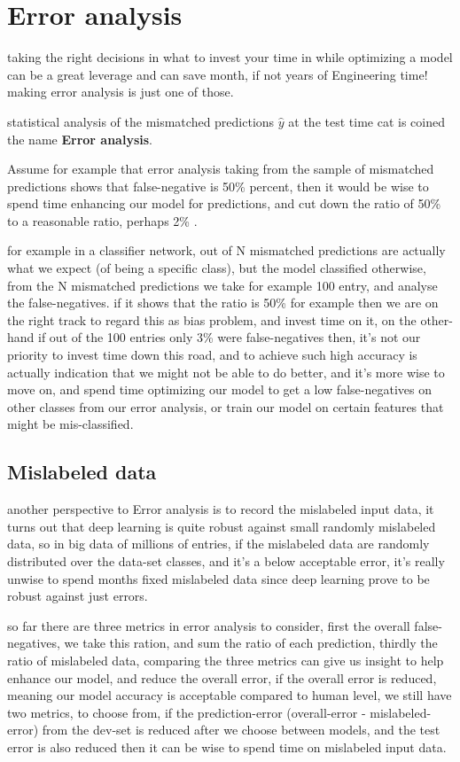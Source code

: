 \documentclass[4apaper,12pt]{book}
\begin{document}
  \section{Error analysis}
  \begin{description}
\item taking the right decisions in what to invest your time in while optimizing a model can be a great leverage and can save month, if not years of Engineering time! making error analysis is just one of those.

\item statistical analysis of the mismatched predictions $\hat{y}$ at the test time cat is coined the name \textbf{Error analysis}.
\item Assume for example that error analysis taking from the sample of mismatched predictions shows that false-negative is 50\% percent, then it would be wise to spend time enhancing our model for predictions, and cut down the ratio of 50\% to a reasonable ratio, perhaps 2\% .
\item for example in a classifier network, out of N mismatched predictions are actually what we expect (of being a specific class), but the model classified otherwise, from the N mismatched predictions we take for example 100 entry, and analyse the false-negatives. if it shows that the ratio is 50\% for example then we are on the right track to regard this as bias problem, and invest time on it, on the other-hand if out of the 100 entries only 3\% were false-negatives then, it's not our priority to invest time down this road, and to achieve such high accuracy is actually indication that we might not be able to do better, and it's more wise to move on, and spend time optimizing our model to get a low false-negatives on other classes from our error analysis, or train our model on certain features that might be mis-classified.
  \subsection{Mislabeled  data}
\item another perspective to Error analysis is to record the mislabeled input data, it turns out that deep learning is quite robust against small randomly mislabeled data, so in big data of millions of entries, if the mislabeled data are randomly distributed over the data-set classes, and it's a below acceptable error, it's really unwise to spend months fixed mislabeled data since deep learning prove to be robust against just errors.
\item so far there are three metrics in error analysis to consider, first the overall false-negatives, we take this ration, and sum the ratio of each prediction, thirdly the ratio of mislabeled data, comparing the three metrics can give us insight to help enhance our model, and reduce the overall error, if the overall error is reduced, meaning our model accuracy is acceptable compared to human level, we still have two metrics, to choose from, if the prediction-error (overall-error - mislabeled-error) from the dev-set is reduced after we choose between models, and the test error is also reduced then it can be wise to spend time on mislabeled input data.


\end{description}
\end{document}
